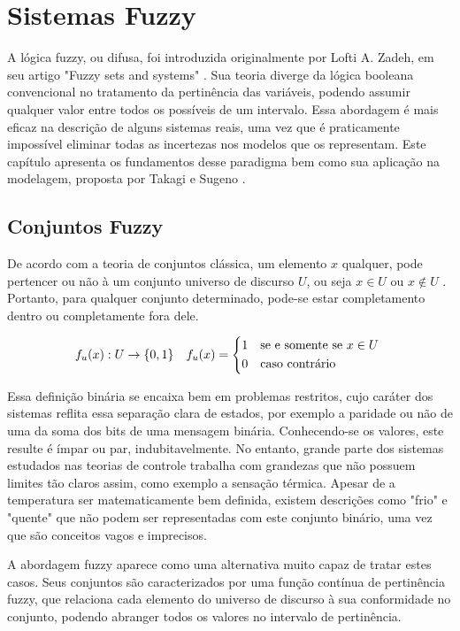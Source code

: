 %

\chapter{Sistemas Fuzzy} \label{capFundFuzzy}
A lógica fuzzy, ou difusa, foi introduzida originalmente por Lofti A. Zadeh, em seu artigo "Fuzzy sets and systems" \cite{zadeh}. Sua teoria diverge da lógica booleana convencional no tratamento da pertinência das variáveis, podendo assumir qualquer valor entre todos os possíveis de um intervalo. Essa abordagem é mais eficaz na descrição de alguns sistemas reais, uma vez que é praticamente impossível eliminar todas as incertezas nos modelos que os representam. Este capítulo apresenta os fundamentos desse paradigma bem como sua aplicação na modelagem, proposta por Takagi e Sugeno \cite{takagiSugeno}.

\section{Conjuntos Fuzzy}
De acordo com a teoria de conjuntos clássica, um elemento $x$ qualquer, pode pertencer ou não à um conjunto universo de discurso $U$, ou seja $x \in U$ ou $x \notin U$ . Portanto, para qualquer conjunto determinado, pode-se estar completamento dentro ou completamente fora dele.

\begin{align}
	f_u(x) : U \rightarrow \{0,1\}
	&& f_u(x) =
	\begin{cases*}
		1 & se e somente se $x \in U$ \\
		0 & caso contrário
	\end{cases*}
	\label{eqFPertinencia}
\end{align}

Essa definição binária se encaixa bem em problemas restritos, cujo caráter dos sistemas reflita essa separação clara de estados, por exemplo a paridade ou não de uma da soma dos bits de uma mensagem binária. Conhecendo-se os valores, este resulte é ímpar ou par, indubitavelmente. No entanto, grande parte dos sistemas estudados nas teorias de controle trabalha com grandezas que não possuem limites tão claros assim, como exemplo a sensação térmica. Apesar de a temperatura ser matematicamente bem definida, existem descrições como "frio" e "quente" que não podem ser representadas com este conjunto binário, uma vez que são conceitos vagos e imprecisos.

A abordagem fuzzy aparece como uma alternativa muito capaz de tratar estes casos. Seus conjuntos são caracterizados por uma função contínua de pertinência fuzzy, que relaciona cada elemento do universo de discurso à sua conformidade no conjunto, podendo abranger todos os valores no intervalo de pertinência.

